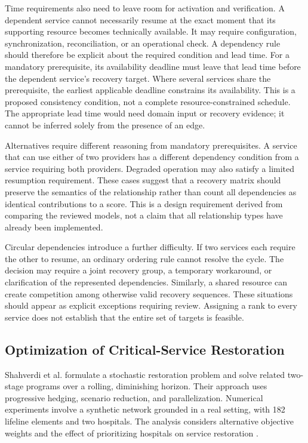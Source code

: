 Time requirements also need to leave room for activation and verification. A dependent service cannot necessarily resume at the exact moment that its supporting resource becomes technically available. It may require configuration, synchronization, reconciliation, or an operational check. A dependency rule should therefore be explicit about the required condition and lead time. For a mandatory prerequisite, its availability deadline must leave that lead time before the dependent service's recovery target. Where several services share the prerequisite, the earliest applicable deadline constrains its availability. This is a proposed consistency condition, not a complete resource-constrained schedule. The appropriate lead time would need domain input or recovery evidence; it cannot be inferred solely from the presence of an edge.

Alternatives require different reasoning from mandatory prerequisites. A service that can use either of two providers has a different dependency condition from a service requiring both providers. Degraded operation may also satisfy a limited resumption requirement. These cases suggest that a recovery matrix should preserve the semantics of the relationship rather than count all dependencies as identical contributions to a score. This is a design requirement derived from comparing the reviewed models, not a claim that all relationship types have already been implemented.

Circular dependencies introduce a further difficulty. If two services each require the other to resume, an ordinary ordering rule cannot resolve the cycle. The decision may require a joint recovery group, a temporary workaround, or clarification of the represented dependencies. Similarly, a shared resource can create competition among otherwise valid recovery sequences. These situations should appear as explicit exceptions requiring review. Assigning a rank to every service does not establish that the entire set of targets is feasible.

\subsection{Optimization of Critical-Service Restoration}

Shahverdi et al. formulate a stochastic restoration problem and solve related two-stage programs over a rolling, diminishing horizon. Their approach uses progressive hedging, scenario reduction, and parallelization. Numerical experiments involve a synthetic network grounded in a real setting, with 182 lifeline elements and two hospitals. The analysis considers alternative objective weights and the effect of prioritizing hospitals on service restoration \cite{shahverdi2025recovery}.


